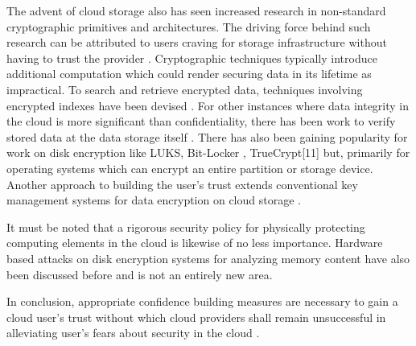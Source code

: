 \documentclass[10pt,twocolumn,pdftex]{article}
\begin{document}
The advent of cloud storage also has seen increased research in non-standard cryptographic primitives and architectures. The driving force behind such research can be attributed to users craving for storage infrastructure without having to trust the provider \cite{Kamara:2010:CCS:1894863.1894876}. Cryptographic techniques typically introduce additional computation which could render securing data in its lifetime as impractical. To search and retrieve encrypted data, techniques involving encrypted indexes have been devised \cite{848445}. For other instances where data integrity in the cloud is more significant than confidentiality, there has been work to verify stored data at the data storage itself \cite{Erway:2009:DPD:1653662.1653688, Ateniese:2007:PDP:1315245.1315318}. There has also been gaining popularity for work on disk encryption \cite{Fruhwirth05newmethods} like LUKS, Bit-Locker \cite{Ferguson06aes-cbc+}, TrueCrypt[11] but, primarily for operating systems which can encrypt an entire partition or storage device. Another approach to building the user’s trust extends conventional key management systems for data encryption on cloud storage \cite{Shin_Kobara_2010}. 

It must be noted that a rigorous security policy for physically protecting computing elements in the cloud is likewise of no less importance. Hardware based attacks on disk encryption systems for analyzing memory content have also been discussed before and is not an entirely new area\cite{Halderman:2009:LWR:1506409.1506429}.

In conclusion, appropriate confidence building measures are necessary to gain a cloud user's trust without which cloud providers shall remain unsuccessful in alleviating user's fears about security in the cloud \cite{5632337}.
\newpage
\nocite{*}

{}

\end{document}
